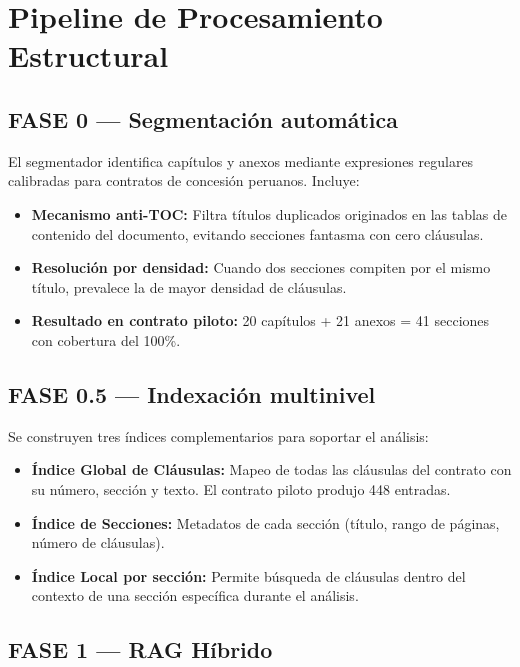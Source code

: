 \section{Pipeline de Procesamiento Estructural}

\subsection{FASE 0 — Segmentación automática}

El segmentador identifica capítulos y anexos mediante expresiones regulares
calibradas para contratos de concesión peruanos. Incluye:

\begin{itemize}
    \item \textbf{Mecanismo anti-TOC:} Filtra títulos duplicados originados
    en las tablas de contenido del documento, evitando secciones fantasma
    con cero cláusulas.
    \item \textbf{Resolución por densidad:} Cuando dos secciones compiten
    por el mismo título, prevalece la de mayor densidad de cláusulas.
    \item \textbf{Resultado en contrato piloto:} 20 capítulos + 21 anexos
    = 41 secciones con cobertura del 100\%.
\end{itemize}

\subsection{FASE 0.5 — Indexación multinivel}

Se construyen tres índices complementarios para soportar el análisis:

\begin{itemize}
    \item \textbf{Índice Global de Cláusulas:} Mapeo de todas las cláusulas
    del contrato con su número, sección y texto. El contrato piloto produjo
    448 entradas.
    \item \textbf{Índice de Secciones:} Metadatos de cada sección (título,
    rango de páginas, número de cláusulas).
    \item \textbf{Índice Local por sección:} Permite búsqueda de cláusulas
    dentro del contexto de una sección específica durante el análisis.
\end{itemize}

\subsection{FASE 1 — RAG Híbrido}

